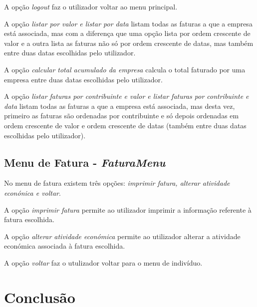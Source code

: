 \documentclass[12pt]{report}
\newcommand\tab[1][0.5cm]{\hspace*{#1}}
\begin{document}
A opção \textit{logout} faz o utilizador voltar ao menu principal.

A opção \textit{listar por valor e listar por data} listam todas as faturas a que a empresa está associada, mas com a diferença que uma opção lista por ordem crescente de valor e a outra lista as faturas não só por ordem crescente de datas, mas também entre duas datas escolhidas pelo utilizador.

A opção \textit{calcular total acumulado da empresa} calcula o total faturado por uma empresa entre duas datas escolhidas pelo utilizador.

A opção \textit{listar faturas por contribuinte e valor e listar faturas por contribuinte e data} listam todas as faturas a que a empresa está associada, mas desta vez, primeiro as faturas são ordenadas por contribuinte e só depois ordenadas em ordem crescente de valor e ordem crescente de datas (também entre duas datas escolhidas pelo utilizador).
\section{Menu de Fatura - \textit{FaturaMenu}}
\tab No menu de fatura existem três opções: \textit{imprimir fatura, alterar atividade econónica e voltar}.

A opção \textit{imprimir fatura} permite ao utilizador imprimir a informação referente à fatura escolhida.

A opção \textit{alterar atividade económica} permite ao utilizador alterar a atividade económica associada à fatura escolhida.

A opção \textit{voltar} faz o utulizador voltar para o menu de indivíduo.

\chapter{Conclusão}
\label{sec:conclusao}
\end{document}
